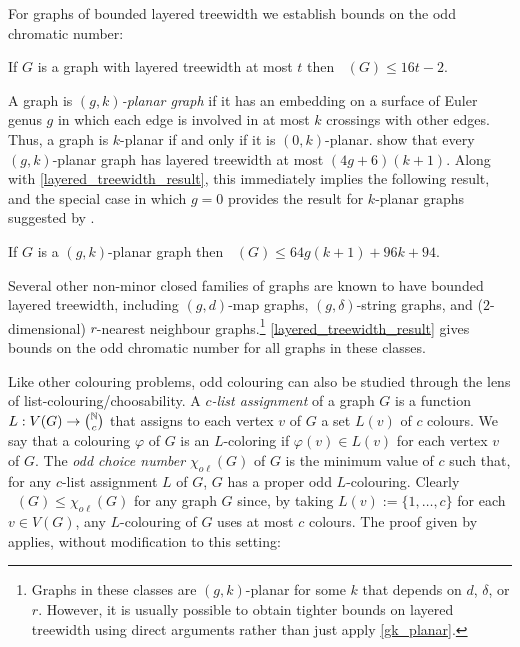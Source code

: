 \documentclass{patmorin}
\DeclareMathOperator{\odd}{\chi_o}
\newcommand{\oddc}{\chi_{o\ell}}
\begin{document}
For graphs of bounded layered treewidth we establish bounds on the odd chromatic number:

\begin{thm}\label{layered_treewidth_result}
  If $G$ is a graph with layered treewidth at most $t$ then $\odd(G)\le 16t-2$.
\end{thm}


A graph is \emph{$(g,k)$-planar graph} if it has an embedding on a surface of Euler genus $g$ in which each edge is involved in at most $k$ crossings with other edges.  Thus, a graph is $k$-planar if and only if it is $(0,k)$-planar.  \citet[Theorem~13]{dujmovic.eppstein.ea:genus} show that every $(g,k)$-planar graph has layered treewidth at most $(4g+6)(k+1)$.  Along with \cref{layered_treewidth_result}, this immediately implies the following result, and the special case in which $g=0$ provides the result for $k$-planar graphs suggested by \citet{cranston.lafferty.ea:note}.


\begin{cor}\label{gk_planar}
  If $G$ is a $(g,k)$-planar graph then $\odd(G)\le 64g(k+1)+96k+94$.
\end{cor}

Several other non-minor closed families of graphs are known to have bounded layered treewidth, including $(g,d)$-map graphs, $(g,\delta)$-string graphs, and ($2$-dimensional) $r$-nearest neighbour graphs.\footnote{Graphs in these classes are $(g,k)$-planar for some $k$ that depends on $d$, $\delta$, or $r$.  However, it is usually possible to obtain tighter bounds on layered treewidth using direct arguments rather than just apply \cref{gk_planar}.}  \cref{layered_treewidth_result} gives bounds on the odd chromatic number for all graphs in these classes.

Like other colouring problems, odd colouring can also be studied through the lens of list-colouring/choosability.  A \emph{$c$-list assignment} of a graph $G$ is a function $L:V(G)\to\binom{\mathbb{N}}{c}$ that assigns to each vertex $v$ of $G$ a set $L(v)$ of $c$ colours.  We say that a colouring $\varphi$ of $G$ is an $L$-coloring if $\varphi(v)\in L(v)$ for each vertex $v$ of $G$.  The \emph{odd choice number} $\oddc(G)$ of $G$ is the minimum value of $c$ such that, for any $c$-list assignment $L$ of $G$, $G$ has a proper odd $L$-colouring. Clearly $\odd(G)\le \oddc(G)$ for any graph $G$ since, by taking $L(v):=\{1,\ldots,c\}$ for each $v\in V(G)$, any $L$-colouring of $G$  uses at most $c$ colours.  The proof given by \citet{cranston.lafferty.ea:note} applies, without modification to this setting:
\end{document}
